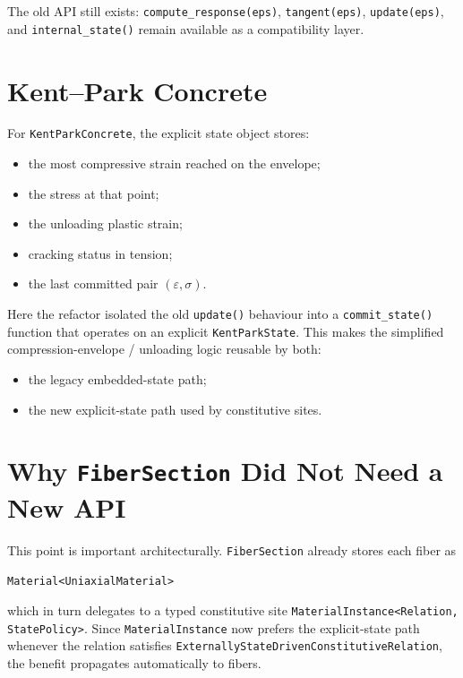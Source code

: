 The old API still exists:
\texttt{compute\_response(eps)}, \texttt{tangent(eps)}, \texttt{update(eps)},
and \texttt{internal\_state()} remain available as a compatibility layer.

\section{Kent--Park Concrete}

For \texttt{KentParkConcrete}, the explicit state object stores:

\begin{itemize}
  \item the most compressive strain reached on the envelope;
  \item the stress at that point;
  \item the unloading plastic strain;
  \item cracking status in tension;
  \item the last committed pair \((\varepsilon,\sigma)\).
\end{itemize}

Here the refactor isolated the old \texttt{update()} behaviour into a
\texttt{commit\_state()} function that operates on an explicit
\texttt{KentParkState}.  This makes the simplified compression-envelope /
unloading logic reusable by both:

\begin{itemize}
  \item the legacy embedded-state path;
  \item the new explicit-state path used by constitutive sites.
\end{itemize}

\section{Why \texttt{FiberSection} Did Not Need a New API}

This point is important architecturally.  \texttt{FiberSection} already stores
each fiber as

\begin{center}
\texttt{Material<UniaxialMaterial>}
\end{center}

which in turn delegates to a typed constitutive site
\texttt{MaterialInstance<Relation, StatePolicy>}.  Since
\texttt{MaterialInstance} now prefers the explicit-state path whenever the
relation satisfies \texttt{ExternallyStateDrivenConstitutiveRelation}, the
benefit propagates automatically to fibers.

